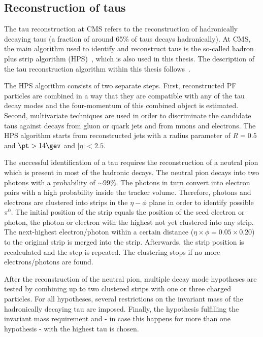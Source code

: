 \subsection{Reconstruction of taus}
\label{subsec:TauReconstruction}
The tau reconstruction at CMS refers to the reconstruction of hadronically decaying taus (a fraction of around 65\% of taus decays hadronically).
At CMS, the main algorithm used to identify and reconstruct taus is the so-called hadron plus strip algorithm (HPS)~\cite{bib:CMS:TauReconstruction_8TeV,bib:CMS:TauReconstruction_7TeV}, which is also used in this thesis.
The description of the tau reconstruction algorithm within this thesis follows~\cite{bib:CMS:TauReconstruction_8TeV}.

The HPS algorithm consists of two separate steps. 
First, reconstructed PF particles are combined in a way that they are compatible with any of the tau decay modes and the four-momentum of this combined object is estimated.
Second, multivariate techniques are used in order to discriminate the candidate taus against decays from gluon or quark jets and from muons and electrons. 
The HPS algorithm starts from reconstructed jets with a radius parameter of $R=0.5$ and $\pt>14\gev$ and $|\eta|<2.5$.

The successful identification of a tau requires the reconstruction of a neutral pion which is present in most of the hadronic decays.
The neutral pion decays into two photons with a probability of $\sim 99\%$. 
The photons in turn convert into electron pairs with a high probability inside the tracker volume.
Therefore, photons and electrons are clustered into strips in the $\eta-\phi$ plane in order to identify possible $\pi^0$.
The initial position of the strip equals the position of the seed electron or photon, \ie the photon or electron with the highest \pt not yet clustered into any strip.
The next-highest \pt electron/photon within a certain distance ($\eta \times \phi = 0.05 \times 0.20$) to the original strip is merged into the strip.
Afterwards, the strip position is recalculated and the step is repeated.
The clustering stops if no more electrons/photons are found.

After the reconstruction of the neutral pion, multiple decay mode hypotheses are tested by combining up to two clustered strips with one or three charged particles.
For all hypotheses, several restrictions on the invariant mass of the hadronically decaying tau are imposed.
Finally, the hypothesis fulfilling the invariant mass requirement and - in case this happens for more than one hypothesis - with the highest \pt tau is chosen.

